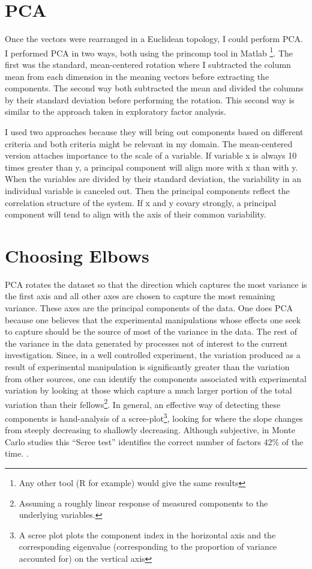 \documentclass[eric_thesis.tex]{subfiles}
\begin{document}
\section{PCA}

Once the vectors were rearranged in a Euclidean topology, I could perform PCA. 
I performed PCA in two ways, both using the princomp tool in Matlab \footnote{Any other tool (R for example) would give the same 
results}. The first was the standard, mean-centered rotation where I subtracted 
the column mean from each dimension in the meaning vectors before extracting the 
components. The second way both subtracted the mean and divided the columns by 
their standard deviation before performing the rotation. This second way is 
similar to the approach taken in exploratory factor analysis. 

I used two approaches because they will bring out components based on different 
criteria and both criteria might be relevant in my domain. The mean-centered 
version attaches importance to the scale of a variable. If variable x is always 
10 times greater than y, a principal component will align more with x than with 
y. When the variables are divided by their standard 
deviation, the variability in an individual variable is canceled out. Then the 
principal components reflect the correlation structure of the system. If x and y 
covary strongly, a principal component will tend to align with the axis of their 
common variability.

\section{Choosing Elbows}

PCA rotates the dataset so that the direction which captures the most
variance is the first axis and all other axes are chosen to capture
the most remaining variance. These axes are the principal components
of the data. One does PCA because one believes that the experimental
manipulations whose effects one seek to capture should be the source
of most of the variance in the data. The rest of the variance in the
data generated by processes not of interest to the current
investigation. Since, in a well controlled experiment, the variation
produced as a result of experimental manipulation is significantly
greater than the variation from other sources, one can identify the
components associated with experimental variation by looking at those
which capture a much larger portion of the total variation than their
fellows\footnote{Assuming a roughly linear response of measured
  components to the underlying variables.}. In general, an effective
way of detecting these components is hand-analysis of a
scree-plot\footnote{A scree plot plots the component index in the
  horizontal axis and the corresponding eigenvalue (corresponding to
  the proportion of variance accounted for) on the vertical axis},
looking for where the slope changes from steeply decreasing to
shallowly decreasing. Although subjective, in Monte Carlo studies this
``Scree test'' identifies the correct number of factors 42\% of the
time. .
\end{document}
